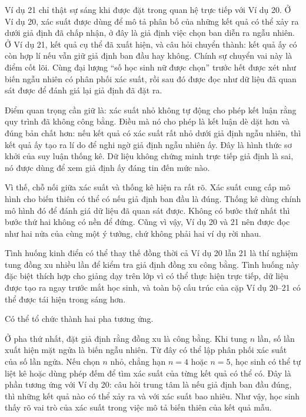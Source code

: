   {
    Ví dụ 21 chỉ thật sự sáng khi được đặt trong quan hệ trực tiếp với Ví dụ 20. Ở Ví dụ 20, xác suất được dùng để mô tả phân bố của những kết quả có thể xảy ra dưới giả định đã chấp nhận, ở đây là giả định việc chọn ban diễn ra ngẫu nhiên. Ở Ví dụ 21, kết quả cụ thể đã xuất hiện, và câu hỏi chuyển thành: kết quả ấy có còn hợp lí nếu vẫn giữ giả định ban đầu hay không. Chính sự chuyển vai này là điểm cốt lõi. Cùng đại lượng ``số học sinh nữ được chọn'' trước hết được xét như biến ngẫu nhiên có phân phối xác suất, rồi sau đó được đọc như dữ liệu đã quan sát được để đánh giá lại giả định đã đặt ra.

    Điểm quan trọng cần giữ là: xác suất nhỏ không tự động cho phép kết luận rằng quy trình đã không công bằng. Điều mà nó cho phép là kết luận dè dặt hơn và đúng bản chất hơn: nếu kết quả có xác suất rất nhỏ dưới giả định ngẫu nhiên, thì kết quả ấy tạo ra lí do để nghi ngờ giả định ngẫu nhiên ấy. Đây là hình thức sơ khởi của suy luận thống kê. Dữ liệu không chứng minh trực tiếp giả định là sai, nó được dùng để xem giả định ấy đáng tin đến mức nào.

    Vì thế, chỗ nối giữa xác suất và thống kê hiện ra rất rõ. Xác suất cung cấp mô hình cho biến thiên có thể có nếu giả định ban đầu là đúng. Thống kê dùng chính mô hình đó để đánh giá dữ liệu đã quan sát được. Không có bước thứ nhất thì bước thứ hai không có nền để đứng. Cũng vì vậy, Ví dụ 20 và 21 nên được đọc như hai nửa của cùng một ý tưởng, chứ không phải hai ví dụ rời nhau.

    Tình huống kinh điển có thể thay thế đồng thời cả Ví dụ 20 lẫn 21 là thí nghiệm tung đồng xu nhiều lần để kiểm tra giả định đồng xu công bằng. Tình huống này đặc biệt thích hợp cho giảng dạy trên lớp vì có thể thực hiện trực tiếp, dữ liệu được tạo ra ngay trước mắt học sinh, và toàn bộ cấu trúc của cặp Ví dụ 20--21 có thể được tái hiện trong sáng hơn.

    Có thể tổ chức thành hai pha tương ứng.

    Ở pha thứ nhất, đặt giả định rằng đồng xu là công bằng. Khi tung $n$ lần, số lần xuất hiện mặt ngửa là biến ngẫu nhiên. Từ đây có thể lập phân phối xác suất của số lần ngửa. Nếu chọn $n$ nhỏ, chẳng hạn $n=4$ hoặc $n=5$, học sinh có thể tự liệt kê hoặc dùng phép đếm để tìm xác suất của từng kết quả có thể có. Đây là phần tương ứng với Ví dụ 20: câu hỏi trung tâm là nếu giả định ban đầu đúng, thì những kết quả nào có thể xảy ra và với xác suất bao nhiêu. Như vậy, học sinh thấy rõ vai trò của xác suất trong việc mô tả biến thiên của kết quả mẫu.

}
